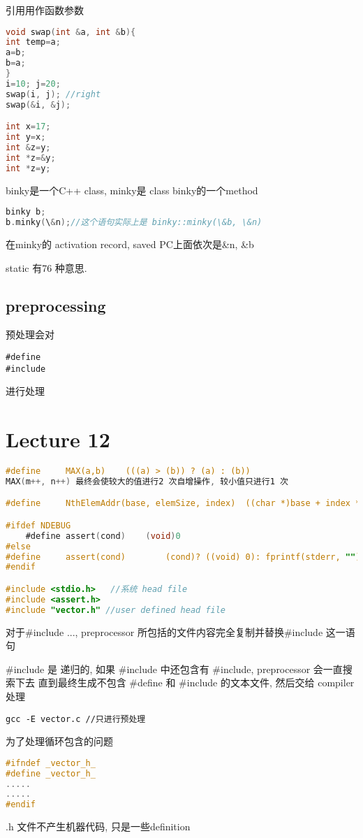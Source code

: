 \documentclass{article}
\begin{document}
引用用作函数参数
\begin{lstlisting}[language = C]
void swap(int &a, int &b){
int temp=a;
a=b;
b=a;
}
i=10; j=20;
swap(i, j); //right
swap(&i, &j);

int x=17;
int y=x;
int &z=y;
int *z=&y;
int *z=y;
\end{lstlisting}

binky是一个C++ class, minky是 class binky的一个method
\begin{lstlisting}[language = C]
binky b;
b.minky(\&n);//这个语句实际上是 binky::minky(\&b, \&n)
\end{lstlisting}
在minky的 activation record, saved PC上面依次是\&n, \&b

static 有76 种意思.

\subsection{preprocessing}
预处理会对
\begin{verbatim}
#define
#include
\end{verbatim}
进行处理

\section{Lecture 12}
\begin{lstlisting}[language = C]
#define 	MAX(a,b)	(((a) > (b)) ? (a) : (b))
MAX(m++, n++) 最终会使较大的值进行2 次自增操作, 较小值只进行1 次

#define 	NthElemAddr(base, elemSize, index) 	((char *)base + index * elemSize)

#ifdef NDEBUG
	#define assert(cond)	(void)0
#else
#define		assert(cond) 		(cond)? ((void) 0): fprintf(stderr, ""), exit(0)
#endif

#include <stdio.h>   //系统 head file
#include <assert.h>
#include "vector.h" //user defined head file
\end{lstlisting}
对于\#include ..., preprocessor 所包括的文件内容完全复制并替换\#include  这一语句

\#include 是 递归的, 如果 \#include 中还包含有 \#include, preprocessor 会一直搜索下去
直到最终生成不包含 \#define 和 \#include 的文本文件, 然后交给 compiler 处理

\begin{verbatim}
gcc -E vector.c //只进行预处理
\end{verbatim}

为了处理循环包含的问题
\begin{lstlisting}[language = C]
#ifndef _vector_h_
#define _vector_h_
.....
.....
#endif
\end{lstlisting}
.h 文件不产生机器代码, 只是一些definition
\end{document}
